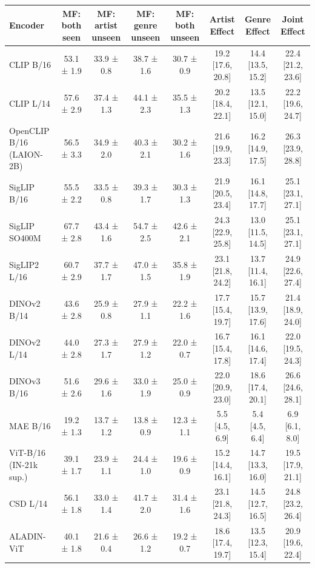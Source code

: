 \begin{tabular}{lccccccc}
\toprule
Encoder & MF: both seen & MF: artist unseen & MF: genre unseen & MF: both unseen & Artist Effect & Genre Effect & Joint Effect \\
\midrule
CLIP B/16 & 53.1 ± 1.9 & 33.9 ± 0.8 & 38.7 ± 1.6 & 30.7 ± 0.9 & 19.2 [17.6, 20.8] & 14.4 [13.5, 15.2] & 22.4 [21.2, 23.6] \\
CLIP L/14 & 57.6 ± 2.9 & 37.4 ± 1.3 & 44.1 ± 2.3 & 35.5 ± 1.3 & 20.2 [18.4, 22.1] & 13.5 [12.1, 15.0] & 22.2 [19.6, 24.7] \\
OpenCLIP B/16 (LAION-2B) & 56.5 ± 3.3 & 34.9 ± 2.0 & 40.3 ± 2.1 & 30.2 ± 1.6 & 21.6 [19.9, 23.3] & 16.2 [14.9, 17.5] & 26.3 [23.9, 28.8] \\
SigLIP B/16 & 55.5 ± 2.2 & 33.5 ± 0.8 & 39.3 ± 1.7 & 30.3 ± 1.3 & 21.9 [20.5, 23.4] & 16.1 [14.8, 17.7] & 25.1 [23.1, 27.1] \\
SigLIP SO400M & 67.7 ± 2.8 & 43.4 ± 1.6 & 54.7 ± 2.5 & 42.6 ± 2.1 & 24.3 [22.9, 25.8] & 13.0 [11.5, 14.5] & 25.1 [23.1, 27.1] \\
SigLIP2 L/16 & 60.7 ± 2.9 & 37.7 ± 1.7 & 47.0 ± 1.5 & 35.8 ± 1.9 & 23.1 [21.8, 24.2] & 13.7 [11.4, 16.1] & 24.9 [22.6, 27.4] \\
DINOv2 B/14 & 43.6 ± 2.8 & 25.9 ± 0.8 & 27.9 ± 1.1 & 22.2 ± 1.6 & 17.7 [15.4, 19.7] & 15.7 [13.9, 17.6] & 21.4 [18.9, 24.0] \\
DINOv2 L/14 & 44.0 ± 2.8 & 27.3 ± 1.7 & 27.9 ± 1.2 & 22.0 ± 0.7 & 16.7 [15.4, 17.8] & 16.1 [14.6, 17.4] & 22.0 [19.5, 24.3] \\
DINOv3 B/16 & 51.6 ± 2.6 & 29.6 ± 1.6 & 33.0 ± 1.9 & 25.0 ± 0.9 & 22.0 [20.9, 23.0] & 18.6 [17.4, 20.1] & 26.6 [24.6, 28.1] \\
MAE B/16 & 19.2 ± 1.3 & 13.7 ± 1.2 & 13.8 ± 0.9 & 12.3 ± 1.1 & 5.5 [4.5, 6.9] & 5.4 [4.5, 6.4] & 6.9 [6.1, 8.0] \\
ViT-B/16 (IN-21k sup.) & 39.1 ± 1.7 & 23.9 ± 1.1 & 24.4 ± 1.0 & 19.6 ± 0.9 & 15.2 [14.4, 16.1] & 14.7 [13.3, 16.0] & 19.5 [17.9, 21.1] \\
CSD L/14 & 56.1 ± 1.8 & 33.0 ± 1.4 & 41.7 ± 2.0 & 31.4 ± 1.6 & 23.1 [21.8, 24.3] & 14.5 [12.7, 16.5] & 24.8 [23.2, 26.4] \\
ALADIN-ViT & 40.1 ± 1.8 & 21.6 ± 0.4 & 26.6 ± 1.2 & 19.2 ± 0.7 & 18.6 [17.4, 19.7] & 13.5 [12.3, 15.4] & 20.9 [19.6, 22.4] \\
\bottomrule
\end{tabular}
